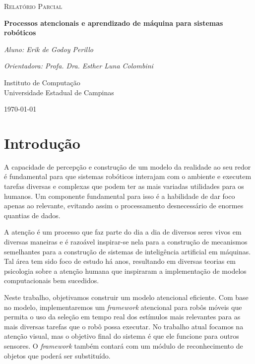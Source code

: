 \documentclass[11pt]{article}
\newcommand{\tit}[1]{\textit{#1}}
\begin{document}
\begin{titlepage}
	\centering
	{\scshape\Large Relatório Parcial\par}
	\vspace{1.5cm}
	{\huge\bfseries Processos atencionais e aprendizado de máquina
		para sistemas robóticos\par}
	\vspace{1cm}
	{\itshape Aluno: Erik de Godoy Perillo\par}
	{\itshape Orientadora: Profa. Dra. Esther Luna Colombini\par}
	\vspace{0.5cm}
	\vfill
    Instituto de Computação\\
	Universidade Estadual de Campinas
	\vfill
	{\large \today\par}
\end{titlepage}

\newpage

\section{Introdução}
A capacidade de percepção e construção de um modelo da realidade ao seu redor
é fundamental para que sistemas robóticos interajam com o ambiente e executem
tarefas diversas e complexas que podem ter as mais variadas utilidades para
os humanos.
Um componente fundamental para isso é a habilidade de dar foco apenas ao
relevante, evitando assim o processamento desnecessário de enormes quantias
de dados.

A atenção é um processo que faz parte do dia a dia de diversos seres vivos
em diversas maneiras e é razoável inspirar-se nela para a construção de
mecanismos semelhantes para a construção de sistemas de inteligência
artificial em máquinas.
Tal área tem sido foco de estudo há anos, resultando em diversas teorias
em psicologia sobre a atenção humana que inspiraram a implementação de
modelos computacionais bem sucedidos.

Neste trabalho, objetivamos construir um modelo atencional eficiente.
Com base no modelo, implementaremos um \tit{framework} atencional para
robôs móveis que permita o uso da seleção em tempo real dos estímulos
mais relevantes para as mais diversas tarefas que o robô possa executar.
No trabalho atual focamos na atenção visual, mas o objetivo
final do sistema é que ele funcione para outros sensores.
O \tit{framework} também contará com um módulo de reconhecimento de objetos
que poderá ser substituído.
\end{document}
